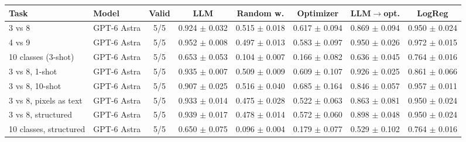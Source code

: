 \begin{tabular}{llcccccc}
\toprule
Task & Model & Valid & LLM & Random w. & Optimizer & LLM$\to$opt. & LogReg \\
\midrule
3 vs 8 & GPT-6 Astra & 5/5 & 0.924 $\pm$ 0.032 & 0.515 $\pm$ 0.018 & 0.617 $\pm$ 0.094 & 0.869 $\pm$ 0.094 & 0.950 $\pm$ 0.024 \\
4 vs 9 & GPT-6 Astra & 5/5 & 0.952 $\pm$ 0.008 & 0.497 $\pm$ 0.013 & 0.583 $\pm$ 0.097 & 0.950 $\pm$ 0.026 & 0.972 $\pm$ 0.015 \\
10 classes (3-shot) & GPT-6 Astra & 5/5 & 0.653 $\pm$ 0.053 & 0.104 $\pm$ 0.007 & 0.166 $\pm$ 0.082 & 0.636 $\pm$ 0.045 & 0.764 $\pm$ 0.016 \\
3 vs 8, 1-shot & GPT-6 Astra & 5/5 & 0.935 $\pm$ 0.007 & 0.509 $\pm$ 0.009 & 0.609 $\pm$ 0.107 & 0.926 $\pm$ 0.025 & 0.861 $\pm$ 0.066 \\
3 vs 8, 10-shot & GPT-6 Astra & 5/5 & 0.907 $\pm$ 0.025 & 0.516 $\pm$ 0.040 & 0.685 $\pm$ 0.164 & 0.846 $\pm$ 0.057 & 0.957 $\pm$ 0.011 \\
3 vs 8, pixels as text & GPT-6 Astra & 5/5 & 0.933 $\pm$ 0.014 & 0.475 $\pm$ 0.028 & 0.522 $\pm$ 0.063 & 0.863 $\pm$ 0.081 & 0.950 $\pm$ 0.024 \\
3 vs 8, structured & GPT-6 Astra & 5/5 & 0.939 $\pm$ 0.017 & 0.478 $\pm$ 0.014 & 0.572 $\pm$ 0.060 & 0.898 $\pm$ 0.048 & 0.950 $\pm$ 0.024 \\
10 classes, structured & GPT-6 Astra & 5/5 & 0.650 $\pm$ 0.075 & 0.096 $\pm$ 0.004 & 0.179 $\pm$ 0.077 & 0.529 $\pm$ 0.102 & 0.764 $\pm$ 0.016 \\
\bottomrule
\end{tabular}
